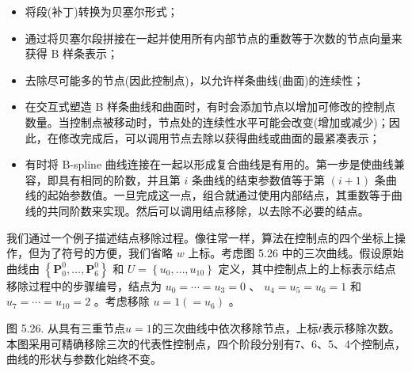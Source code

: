 \documentclass[../main.tex]{subfiles}
\begin{document}
\begin{itemize}
\item 将段(补丁)转换为贝塞尔形式；
\end{itemize}

\begin{itemize}
\item 通过将贝塞尔段拼接在一起并使用所有内部节点的重数等于次数的节点向量来获得 B 样条表示；
\end{itemize}

\begin{itemize}
\item 去除尽可能多的节点(因此控制点)，以允许样条曲线(曲面)的连续性；
\end{itemize}

\begin{itemize}
\item 在交互式塑造 B 样条曲线和曲面时，有时会添加节点以增加可修改的控制点数量。当控制点被移动时，节点处的连续性水平可能会改变(增加或减少)；因此，在修改完成后，可以调用节点去除以获得曲线或曲面的最紧凑表示；
\end{itemize}

\begin{itemize}
\item 有时将 B-spline 曲线连接在一起以形成复合曲线是有用的。第一步是使曲线兼容，即具有相同的阶数，并且第 \(i\) 条曲线的结束参数值等于第 \(\left( {i + 1}\right)\) 条曲线的起始参数值。一旦完成这一点，组合就通过使用内部结点，其重数等于曲线的共同阶数来实现。然后可以调用结点移除，以去除不必要的结点。
\end{itemize}

我们通过一个例子描述结点移除过程。像往常一样，算法在控制点的四个坐标上操作，但为了符号的方便，我们省略 \(w\) 上标。考虑图 5.26 中的三次曲线。假设原始曲线由 \(\left\{  {{\mathbf{P}}_{0}^{0},\ldots ,{\mathbf{P}}_{6}^{0}}\right\}\) 和 \(U = \left\{  {{u}_{0},\ldots ,{u}_{10}}\right\}\) 定义，其中控制点上的上标表示结点移除过程中的步骤编号，结点为 \({u}_{0} = \cdots  = {u}_{3} = 0\) 、 \({u}_{4} = {u}_{5} = {u}_{6} = 1\) 和 \({u}_{7} = \cdots  = {u}_{10} = 2\) 。考虑移除 \(u = 1\left( { = {u}_{6}}\right)\) 。

\begin{center}
\begin{minipage}{24cm}
\vspace*{.6\baselineskip}
\centering
{}
\par\smallskip
图 5.26. 从具有三重节点$u=1$的三次曲线中依次移除节点，上标$t$表示移除次数。\\
本图采用可精确移除三次的代表性控制点，四个阶段分别有7、6、5、4个控制点，曲线的形状与参数化始终不变。
\end{minipage}
\end{center}
\end{document}
